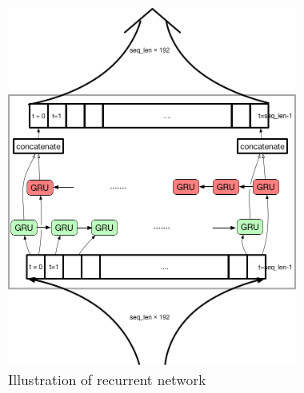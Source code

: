 \begin{figure}[H] 
	\centering
	\includegraphics[width=3in]{Figures/rnn_layer}
	\caption[Detail inside recurrent unit]{Illustration of recurrent network}
	\label{fig:rnn_layer}
\end{figure}


